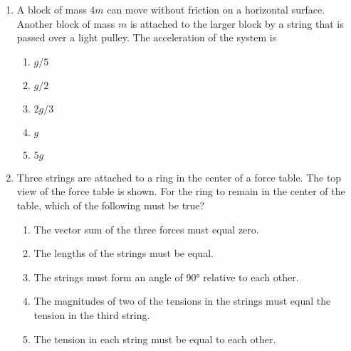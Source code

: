 \documentclass{../../../oss-apphys}
\begin{document}
\begin{multicols}{2}
\begin{enumerate}[resume,leftmargin=18pt]
  \item A block of mass $4m$ can move without friction on a horizontal surface.
    Another block of mass $m$ is attached to the larger block by a string that
    is passed over a light pulley. The acceleration of the system is

    \vspace{-.1in}
    \begin{enumerate}[noitemsep,topsep=0pt,leftmargin=18pt,label=(\Alph*)]
    \item $g/5$
    \item $g/2$
    \item $2g/3$
    \item $g$
    \item $5g$
    \end{enumerate}


  \item Three strings are attached to a ring in the center of a force table. The
    top view of the force table is shown. For the ring to remain in the
    center of the table, which of the following must be true?
    \begin{enumerate}[noitemsep,topsep=0pt,leftmargin=18pt,label=(\Alph*)]
    \item The vector sum of the three forces must equal zero.
    \item The lengths of the strings must be equal.
    \item The strings must form an angle of \ang{90} relative to each other.
    \item The magnitudes of two of the tensions in the strings must equal the
      tension in the third string.
    \item The tension in each string must be equal to each other.
    \end{enumerate}  
  \end{enumerate}
  \columnbreak
  

\end{multicols}
\end{document}

